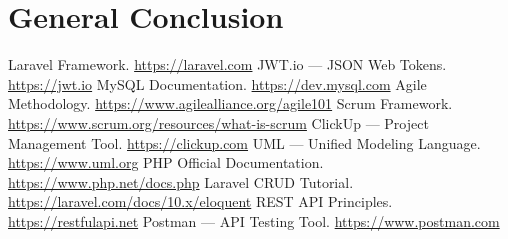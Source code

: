\documentclass[12pt,a4paper]{report}
\begin{document}


\tableofcontents
\listoffigures
\listoftables

\clearpage
{}






\clearpage
\chapter*{General Conclusion}


\clearpage
{} %
\begin{thebibliography}{9}
 Laravel Framework. \url{https://laravel.com}  
 JWT.io — JSON Web Tokens. \url{https://jwt.io}  
 MySQL Documentation. \url{https://dev.mysql.com}  
 Agile Methodology. \url{https://www.agilealliance.org/agile101}  
 Scrum Framework. \url{https://www.scrum.org/resources/what-is-scrum}  
 ClickUp — Project Management Tool. \url{https://clickup.com}  
 UML — Unified Modeling Language. \url{https://www.uml.org}  
 PHP Official Documentation. \url{https://www.php.net/docs.php}  
 Laravel CRUD Tutorial. \url{https://laravel.com/docs/10.x/eloquent}  
 REST API Principles. \url{https://restfulapi.net}  
 Postman — API Testing Tool. \url{https://www.postman.com}  
\end{thebibliography}
\end{document}
